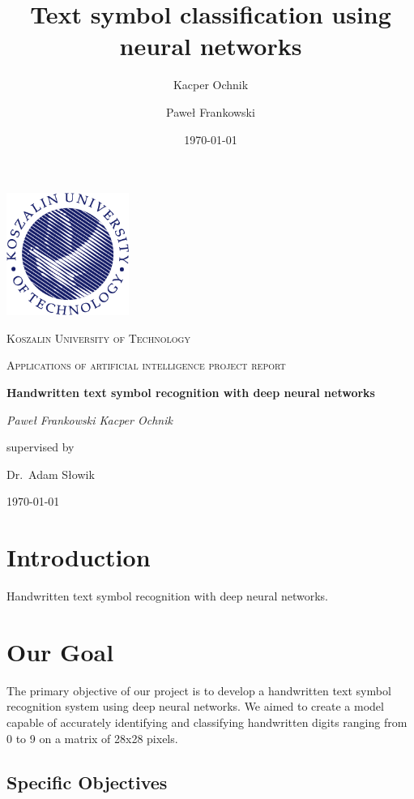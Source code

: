 \documentclass{article}
\title{Text symbol classification using neural networks}
\author{Kacper Ochnik \and Paweł Frankowski}
\date{\today}
\begin{document}
\begin{titlepage}
	\centering
	\includegraphics[width=0.3\textwidth]{Logo_PK_kolor_EN_PNG.png}\par\vspace{1cm}
	{\textsc{Koszalin University of Technology} \par}
	\vspace{1cm}
	{\Large \textsc{Applications of artificial intelligence project report}\par}
	\vspace{1.5cm}
	{\huge\bfseries Handwritten text symbol recognition with deep neural networks
	\par}
	\vspace{2cm}
	{\Large\itshape {Paweł Frankowski \space Kacper Ochnik}\par}
	\vfill
	supervised by\par
	Dr.~Adam Słowik

	\vfill

	{\large \today\par}
\end{titlepage}

\tableofcontents
\newpage

\section{Introduction}
Handwritten text symbol recognition with deep neural networks.

\section{Our Goal}

The primary objective of our project is to develop a handwritten text symbol recognition system using deep neural networks. We aimed to create a model capable of accurately identifying and classifying handwritten digits ranging from 0 to 9 on a matrix of 28x28 pixels.

\subsection{Specific Objectives}
\end{document}
